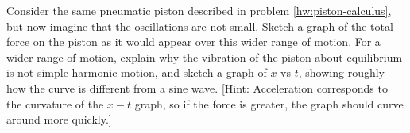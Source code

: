 Consider the same pneumatic piston described in problem \ref{hw:piston-calculus},
but now imagine that the oscillations are
not small. Sketch a graph of the total force on the piston
as it would appear over this wider range of motion. For a
wider range of motion, explain why the vibration of the
piston about equilibrium is not simple harmonic motion, and
sketch a graph of $x$ vs $t$, showing roughly how the curve
is different from a sine wave. [Hint: Acceleration
corresponds to the curvature of the $x-t$ graph, so if the
force is greater, the graph should curve around more quickly.]

